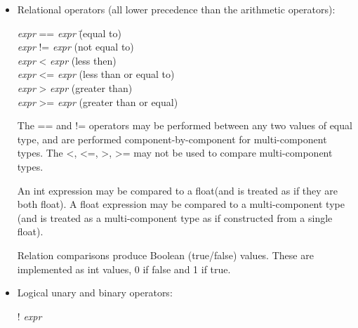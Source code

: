 \documentclass[11pt,letterpaper]{book}
\def\float{{\cf float}\xspace}
\def\inttype{{\cf int}\xspace}
\begin{document}
\begin{itemize}
The integer and bit-wise operators {\cf \%}, {\cf <<}, {\cf >>},
{\cf \&}, {\cf \verb|^|}, and {\cf |} may only be used with expressions
of type \inttype.

For details on which operators are allowed, please consult the operator
tables for each individual type in Chapter~\ref{chap:types}.

\item Relational operators (all lower precedence than the arithmetic
operators):

\begin{tabbing}
\hspace{0.25in} \emph{expr} {\cf ==} \emph{expr} \hspace{1in} \= (equal to) \\
\hspace{0.25in} \emph{expr} {\cf !=} \emph{expr} \> (not equal to) \\
\hspace{0.25in} \emph{expr} {\cf <} \emph{expr} \> (less then) \\
\hspace{0.25in} \emph{expr} {\cf <=} \emph{expr} \> (less than or equal to) \\
\hspace{0.25in} \emph{expr} {\cf >} \emph{expr} \> (greater than) \\
\hspace{0.25in} \emph{expr} {\cf >=} \emph{expr} \> (greater than or equal) \\
\end{tabbing}

The {\cf ==} and {\cf !=} operators may be performed between any two
values of equal type, and are performed component-by-component for
multi-component types.  The {\cf <}, {\cf <=}, {\cf >}, {\cf >=} may not
be used to compare multi-component types.

An \inttype expression may be compared to a \float (and is treated as if
they are both \float).  A \float expression may be compared to a
multi-component type (and is treated as a multi-component type as if
constructed from a single float).

Relation comparisons produce Boolean (true/false) values.  These
are implemented as \inttype values, 0 if false and 1 if true.

\item Logical unary and binary operators:

\hspace{0.5in}    {\cf !} \emph{expr}


\end{itemize}
\end{document}
